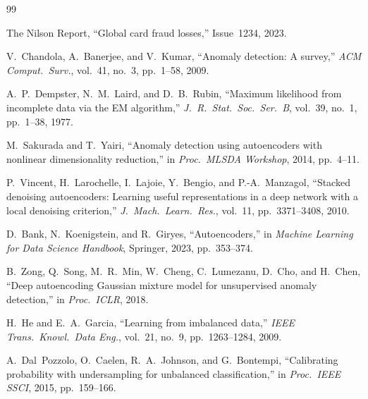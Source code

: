 \documentclass[conference,10pt]{IEEEtran}
\begin{document}
\balance
\begin{thebibliography}{99}

The Nilson Report, ``Global card fraud losses,'' Issue~1234, 2023.

V.~Chandola, A.~Banerjee, and V.~Kumar,
``Anomaly detection: A survey,''
\emph{ACM Comput.\ Surv.}, vol.~41, no.~3, pp.~1--58, 2009.

A.~P.~Dempster, N.~M.~Laird, and D.~B.~Rubin,
``Maximum likelihood from incomplete data via the EM algorithm,''
\emph{J.\ R.\ Stat.\ Soc.\ Ser.\ B}, vol.~39, no.~1, pp.~1--38, 1977.

M.~Sakurada and T.~Yairi,
``Anomaly detection using autoencoders with nonlinear dimensionality
reduction,''
in \emph{Proc.\ MLSDA Workshop}, 2014, pp.~4--11.

P.~Vincent, H.~Larochelle, I.~Lajoie, Y.~Bengio, and P.-A.~Manzagol,
``Stacked denoising autoencoders: Learning useful representations in a deep
network with a local denoising criterion,''
\emph{J.\ Mach.\ Learn.\ Res.}, vol.~11, pp.~3371--3408, 2010.

D.~Bank, N.~Koenigstein, and R.~Giryes,
``Autoencoders,''
in \emph{Machine Learning for Data Science Handbook}, Springer, 2023,
pp.~353--374.

B.~Zong, Q.~Song, M.~R.~Min, W.~Cheng, C.~Lumezanu, D.~Cho, and H.~Chen,
``Deep autoencoding Gaussian mixture model for unsupervised anomaly
detection,''
in \emph{Proc.\ ICLR}, 2018.

H.~He and E.~A.~Garcia,
``Learning from imbalanced data,''
\emph{IEEE Trans.\ Knowl.\ Data Eng.}, vol.~21, no.~9, pp.~1263--1284, 2009.

A.~Dal~Pozzolo, O.~Caelen, R.~A.~Johnson, and G.~Bontempi,
``Calibrating probability with undersampling for unbalanced classification,''
in \emph{Proc.\ IEEE SSCI}, 2015, pp.~159--166.

\end{thebibliography}
\end{document}
